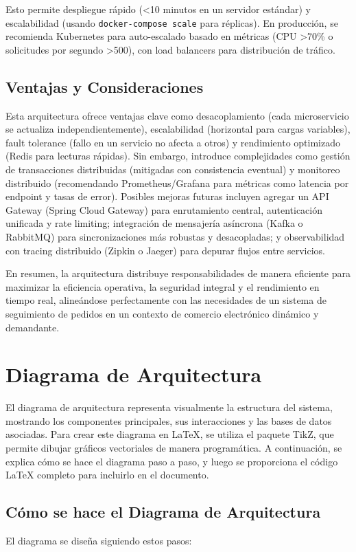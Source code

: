 \documentclass[a4paper,12pt]{article}
\begin{document}
Esto permite despliegue rápido (<10 minutos en un servidor estándar) y escalabilidad (usando \texttt{docker-compose scale} para réplicas). En producción, se recomienda Kubernetes para auto-escalado basado en métricas (CPU >70\% o solicitudes por segundo >500), con load balancers para distribución de tráfico.

\subsection{Ventajas y Consideraciones}
Esta arquitectura ofrece ventajas clave como desacoplamiento (cada microservicio se actualiza independientemente), escalabilidad (horizontal para cargas variables), fault tolerance (fallo en un servicio no afecta a otros) y rendimiento optimizado (Redis para lecturas rápidas). Sin embargo, introduce complejidades como gestión de transacciones distribuidas (mitigadas con consistencia eventual) y monitoreo distribuido (recomendando Prometheus/Grafana para métricas como latencia por endpoint y tasas de error). Posibles mejoras futuras incluyen agregar un API Gateway (Spring Cloud Gateway) para enrutamiento central, autenticación unificada y rate limiting; integración de mensajería asíncrona (Kafka o RabbitMQ) para sincronizaciones más robustas y desacopladas; y observabilidad con tracing distribuido (Zipkin o Jaeger) para depurar flujos entre servicios.

En resumen, la arquitectura distribuye responsabilidades de manera eficiente para maximizar la eficiencia operativa, la seguridad integral y el rendimiento en tiempo real, alineándose perfectamente con las necesidades de un sistema de seguimiento de pedidos en un contexto de comercio electrónico dinámico y demandante.

\section{Diagrama de Arquitectura}
El diagrama de arquitectura representa visualmente la estructura del sistema, mostrando los componentes principales, sus interacciones y las bases de datos asociadas. Para crear este diagrama en LaTeX, se utiliza el paquete TikZ, que permite dibujar gráficos vectoriales de manera programática. A continuación, se explica cómo se hace el diagrama paso a paso, y luego se proporciona el código LaTeX completo para incluirlo en el documento.

\subsection{Cómo se hace el Diagrama de Arquitectura}
El diagrama se diseña siguiendo estos pasos:
\end{document}
